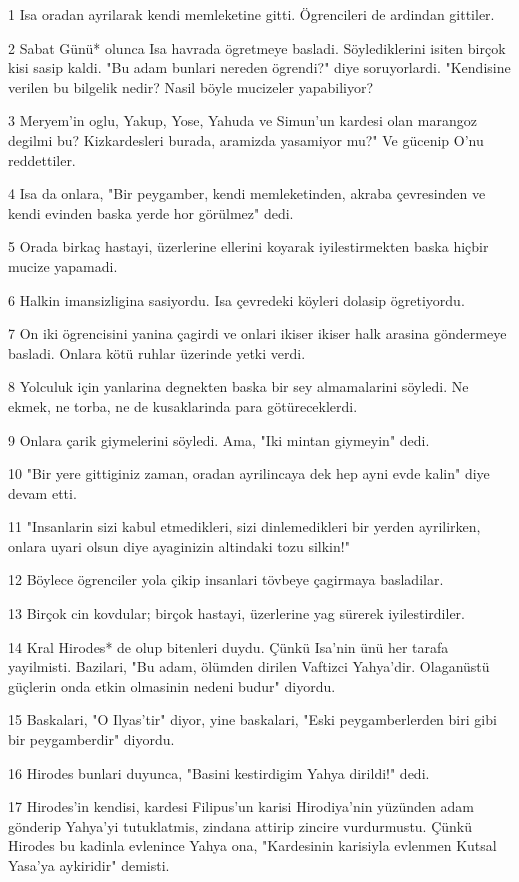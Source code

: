 \par 1 Isa oradan ayrilarak kendi memleketine gitti. Ögrencileri de ardindan gittiler.
\par 2 Sabat Günü* olunca Isa havrada ögretmeye basladi. Söylediklerini isiten birçok kisi sasip kaldi. "Bu adam bunlari nereden ögrendi?" diye soruyorlardi. "Kendisine verilen bu bilgelik nedir? Nasil böyle mucizeler yapabiliyor?
\par 3 Meryem'in oglu, Yakup, Yose, Yahuda ve Simun'un kardesi olan marangoz degilmi bu? Kizkardesleri burada, aramizda yasamiyor mu?" Ve gücenip O'nu reddettiler.
\par 4 Isa da onlara, "Bir peygamber, kendi memleketinden, akraba çevresinden ve kendi evinden baska yerde hor görülmez" dedi.
\par 5 Orada birkaç hastayi, üzerlerine ellerini koyarak iyilestirmekten baska hiçbir mucize yapamadi.
\par 6 Halkin imansizligina sasiyordu. Isa çevredeki köyleri dolasip ögretiyordu.
\par 7 On iki ögrencisini yanina çagirdi ve onlari ikiser ikiser halk arasina göndermeye basladi. Onlara kötü ruhlar üzerinde yetki verdi.
\par 8 Yolculuk için yanlarina degnekten baska bir sey almamalarini söyledi. Ne ekmek, ne torba, ne de kusaklarinda para götüreceklerdi.
\par 9 Onlara çarik giymelerini söyledi. Ama, "Iki mintan giymeyin" dedi.
\par 10 "Bir yere gittiginiz zaman, oradan ayrilincaya dek hep ayni evde kalin" diye devam etti.
\par 11 "Insanlarin sizi kabul etmedikleri, sizi dinlemedikleri bir yerden ayrilirken, onlara uyari olsun diye ayaginizin altindaki tozu silkin!"
\par 12 Böylece ögrenciler yola çikip insanlari tövbeye çagirmaya basladilar.
\par 13 Birçok cin kovdular; birçok hastayi, üzerlerine yag sürerek iyilestirdiler.
\par 14 Kral Hirodes* de olup bitenleri duydu. Çünkü Isa'nin ünü her tarafa yayilmisti. Bazilari, "Bu adam, ölümden dirilen Vaftizci Yahya'dir. Olaganüstü güçlerin onda etkin olmasinin nedeni budur" diyordu.
\par 15 Baskalari, "O Ilyas'tir" diyor, yine baskalari, "Eski peygamberlerden biri gibi bir peygamberdir" diyordu.
\par 16 Hirodes bunlari duyunca, "Basini kestirdigim Yahya dirildi!" dedi.
\par 17 Hirodes'in kendisi, kardesi Filipus'un karisi Hirodiya'nin yüzünden adam gönderip Yahya'yi tutuklatmis, zindana attirip zincire vurdurmustu. Çünkü Hirodes bu kadinla evlenince Yahya ona, "Kardesinin karisiyla evlenmen Kutsal Yasa'ya aykiridir" demisti.
